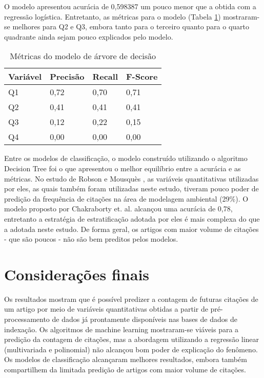 \documentclass[runningheads]{llncs}
\begin{document}
O modelo apresentou acurácia de 0,598387 um pouco menor que a obtida com a regressão logística. Entretanto, as métricas para o modelo (Tabela \ref{tabmdt}) mostraram-se melhores para Q2 e Q3, embora tanto para o terceiro quanto para o quarto quadrante ainda sejam pouco explicados pelo modelo.

\begin{table}[]
    \centering
    \caption{Métricas do modelo de árvore de decisão}
    \label{tabmdt}
    \begin{tabular}{|l|l|l|l|}
         \hline
         Variável & Precisão & Recall & F-Score\\
         \hline
         Q1 & 0,72 & 0,70 & 0,71\\
         Q2 & 0,41 & 0,41 & 0,41\\
         Q3 & 0,12 & 0,22 & 0,15\\
         Q4 & 0,00 & 0,00 & 0,00\\
         \hline
    \end{tabular}
\end{table}

Entre os modelos de classificação, o modelo construído utilizando o algoritmo Decision Tree foi o que apresentou o melhor equilíbrio entre a acurácia e as métricas. No estudo de Robson e Mousquès \cite{Robson2016}, as variáveis quantitativas utilizadas por eles, as quais também foram utilizadas neste estudo, tiveram pouco poder de predição da frequência de citações na área de modelagem ambiental (29\%). O modelo proposto por Chakraborty et. al. \cite{Chakraborty2014} alcançou uma acurácia de 0,78, entretanto a estratégia de estratificação adotada por eles é mais complexa do que a adotada neste estudo. De forma geral, os artigos com maior volume de citações - que são poucos - não são bem preditos pelos modelos.

\section{Considerações finais}

Os resultados mostram que é possível predizer a contagem de futuras citações de um artigo por meio de variáveis quantitativas obtidas a partir de pré-processamento de dados já prontamente disponíveis nas bases de dados de indexação. Os algoritmos de machine learning mostraram-se viáveis para a predição da contagem de citações, mas a abordagem utilizando a regressão linear (multivariada e polinomial) não alcançou bom poder de explicação do fenômeno. Os modelos de classificação alcançaram melhores resultados, embora também compartilhem da limitada predição de artigos com maior volume de citações.
\end{document}

